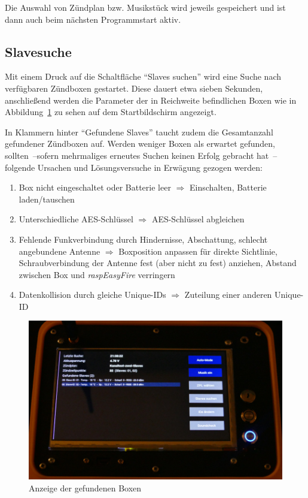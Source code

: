 \documentclass[paper=a4, parskip, numbers=noenddot, toc=listof, headsepline]{scrbook}
\newcommand{\REF}{\emph{raspEasyFire}}
\begin{document}
				Die Auswahl von Zündplan bzw. Musikstück wird jeweils gespeichert und ist dann auch beim nächsten Programmstart aktiv.

			\subsection{Slavesuche}

				Mit einem Druck auf die Schaltfläche \enquote{Slaves suchen} wird eine Suche nach verfügbaren Zündboxen gestartet. Diese dauert etwa sieben Sekunden, anschließend werden die Parameter der in Reichweite befindlichen Boxen wie in Abbildung~\ref{fig:REFslavesfound} zu sehen auf dem Startbildschirm angezeigt.

				In Klammern hinter \enquote{Gefundene Slaves} taucht zudem die Gesamtanzahl gefundener Zündboxen auf. Werden weniger Boxen als erwartet gefunden, sollten~--sofern mehrmaliges erneutes Suchen keinen Erfolg gebracht hat~-- folgende Ursachen und Lösungsversuche in Erwägung gezogen werden:
				\begin{enumerate}
					\item
					      Box nicht eingeschaltet oder Batterie leer $\Rightarrow$ Einschalten, Batterie laden/tauschen
					\item
					      Unterschiedliche AES-Schlüssel $\Rightarrow$ AES-Schlüssel abgleichen
					\item
					      Fehlende Funkverbindung durch Hindernisse, Abschattung, schlecht angebundene Antenne $\Rightarrow$ Boxposition anpassen für direkte Sichtlinie, Schraubverbindung der Antenne fest (aber nicht zu fest) anziehen, Abstand zwischen Box und {\REF} verringern
					\item
					      Datenkollision durch gleiche Unique-IDs $\Rightarrow$ Zuteilung einer anderen Unique-ID
				\end{enumerate}

				\begin{figure}
					\centering\includegraphics[width=150mm]{Bilder/REFslavesfound}
					\caption{Anzeige der gefundenen Boxen}
					\label{fig:REFslavesfound}
				\end{figure}
\end{document}
